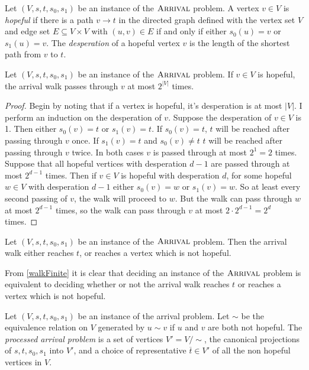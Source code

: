 \begin{definition}
  Let $(V, s, t, s_0, s_1)$ be an instance of the $\textsc{Arrival}$ problem. A vertex $v \in V$
  is \emph{hopeful} if there is a path $v \to t$ in the directed graph defined with
  the vertex set $V$ and edge set $E \subseteq V \times V$ with $(u, v) \in E$ if and
  only if either $s_0(u) = v$ or $s_1(u) = v$. The \emph{desperation} of a hopeful vertex
  $v$ is the length of the shortest path from $v$ to $t$.
\end{definition}
\begin{lemma}
  Let $(V, s, t, s_0, s_1)$  be an instance of the $\textsc{Arrival}$ problem. If $v \in V$ is hopeful,
  the arrival walk passes through $v$ at most $2^{|V|}$ times.
\end{lemma}
\begin{proof}
  Begin by noting that if a vertex is hopeful, it's desperation is at most $|V|$. I perform
  an induction on the desperation of $v$. Suppose the desperation of $v \in V$ is 1. Then either
  $s_0(v) = t$ or $s_1(v) = t$. If $s_0(v) = t$, $t$ will be reached after passing through $v$ once.
  If $s_1(v) = t$ and $s_0(v) \neq t$ $t$ will be reached after passing through $v$ twice. In
  both cases $v$ is passed through at most $2^1 = 2$ times. \\
  Suppose that all hopeful vertices with desperation $d - 1$ are passed through at most $2^{d-1}$ times.
  Then if $v \in V$ is hopeful with desperation $d$, for some hopeful $w \in V$ with desperation
  $d - 1$ either $s_0(v) = w$ or $s_1(v) = w$. So at least every second passing of $v$, the
  walk will proceed to $w$. But the walk can pass through $w$ at most $2^{d-1}$ times,
  so the walk can pass through $v$ at most $2 \cdot 2^{d - 1} = 2^d$ times.
\end{proof}
\begin{cor}\label{walkFinite}
  Let $(V, s, t, s_0, s_1)$ be an instance of the $\textsc{Arrival}$ problem. Then the arrival
  walk either reaches $t$, or reaches a vertex which is not hopeful.
\end{cor}
From \cref{walkFinite} it is clear that deciding an instance of the $\textsc{Arrival}$ problem is
equivalent to deciding whether or not the arrival walk reaches $t$ or reaches a vertex which
is not hopeful.
\begin{definition}
  Let $(V, s, t, s_0, s_1)$ be an instance of the arrival problem. Let
  $\sim$ be the equivalence relation on $V$ generated by $u \sim v$ if
  $u$ and $v$ are both not hopeful.
  The \emph{processed arrival problem}
  is a set of vertices $V' = V / \sim$, the canonical projections of $s, t, s_0, s_1$ into $V'$,
  and a choice of representative $\overline{t} \in V'$ of all the non hopeful vertices in $V$.
\end{definition}
